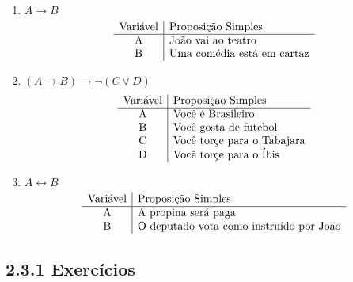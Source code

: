 \begin{enumerate}
\begin{enumerate}
				\item $ A \to B $
				\[\begin{array}{c|l} 
				\text{Vari\'avel} & \text{Proposi\c{c}\~ao Simples} \\ \hline
				$A$        & \text{Jo\~ao vai ao teatro}\\ 
				$B$        & \text{Uma com\'edia est\'a em cartaz}\\
				\end{array}
				\]		
									
				\item $ (A \to B) \to \neg (C \lor D) $
				\[\begin{array}{c|l} 
				\text{Vari\'avel} & \text{Proposi\c{c}\~ao Simples} \\ \hline
				$A$        & \text{Voc\^e \'e Brasileiro}\\ 
				$B$        & \text{Voc\^e gosta de futebol}\\
				$C$        & \text{Voc\^e tor\c{c}e para o Tabajara}\\ 
				$D$        & \text{Voc\^e tor\c{c}e para o \'Ibis}\\
				\end{array}
				\]		
								
				\item $ A \leftrightarrow B $
				\[\begin{array}{c|l} 
				\text{Vari\'avel} & \text{Proposi\c{c}\~ao Simples} \\ \hline
				$A$        & \text{A propina ser\'a paga}\\ 
				$B$        & \text{O deputado vota como instru\'ido por Jo\~ao}\\
				\end{array}
				\]		
							
				\end{enumerate}
	
		\end{enumerate}

\subsection{2.3.1 Exerc\'icios}

